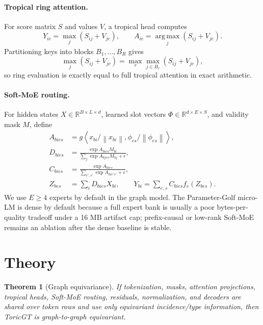 \documentclass[10pt]{article}
\theoremstyle{definition}
\theoremstyle{plain}
\newtheorem{theorem}[definition]{Theorem}
\theoremstyle{remark}
\newcommand{\R}{\mathbb R}
\newcommand{\argmax}{\operatorname*{arg\,max}}
\newcommand{\norm}[1]{\left\lVert #1\right\rVert}
\newcommand{\ip}[2]{\left\langle #1,#2\right\rangle}
\begin{document}
\paragraph{Tropical ring attention.}
For score matrix $S$ and values $V$, a tropical head computes
\begin{equation}
  Y_{ic}=\max_j(S_{ij}+V_{jc}),\qquad
  A_{ic}=\argmax_j(S_{ij}+V_{jc}).
\end{equation}
Partitioning keys into blocks $B_1,\ldots,B_R$ gives
\begin{equation}
  \max_j(S_{ij}+V_{jc})
  =
  \max_r\max_{j\in B_r}(S_{ij}+V_{jc}),
\end{equation}
so ring evaluation is exactly equal to full tropical attention in exact arithmetic.

\paragraph{Soft-MoE routing.}
For hidden states $X\in\R^{B\times L\times d}$, learned slot vectors $\Phi\in\R^{d\times E\times S}$, and validity mask $M$, define
\begin{align}
  A_{bies}&=g\ip{x_{bi}/\norm{x_{bi}}}{\phi_{es}/\norm{\phi_{es}}},\\
  D_{bies}&=\frac{\exp A_{bies}M_{bi}}{\sum_j\exp A_{bjes}M_{bj}+\epsilon},\\
  C_{bies}&=\frac{\exp A_{bies}}{\sum_{e',s'}\exp A_{bie's'}+\epsilon},\\
  Z_{bes}&=\sum_iD_{bies}X_{bi},\qquad
  Y_{bi}=\sum_{e,s}C_{bies}f_e(Z_{bes}).
\end{align}
We use $E\ge4$ experts by default in the graph model.  The Parameter-Golf micro-LM is dense by default because a full expert bank is usually a poor bytes-per-quality tradeoff under a 16 MB artifact cap; prefix-causal or low-rank Soft-MoE remains an ablation after the dense baseline is stable.

\section{Theory}

\begin{theorem}[Graph equivariance]
If tokenization, masks, attention projections, tropical heads, Soft-MoE routing, residuals, normalization, and decoders are shared over token rows and use only equivariant incidence/type information, then ToricGT is graph-to-graph equivariant.
\end{theorem}
\end{document}

